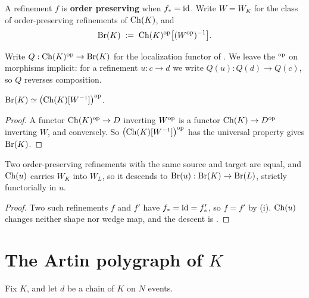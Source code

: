\documentclass[11pt]{article}
\begin{document}
\begin{definition}\label{def:W}
  A refinement $f$ is \textbf{order preserving} when $f_* = \operatorname{id}$. Write $W = W_K$ for
  the class of order-preserving refinements of $\operatorname{Ch}(K)$, and
  \[
    \operatorname{Br}(K) \;:=\; \operatorname{Ch}(K)^{\mathrm{op}}\bigl[(W^{\mathrm{op}})^{-1}\bigr] .
  \]
\end{definition}

Write $Q : \operatorname{Ch}(K)^{\mathrm{op}} \to \operatorname{Br}(K)$ for the localization functor of . We leave the
$^{\mathrm{op}}$ on morphisms implicit: for a refinement $u : c \to d$ we write $Q(u) : Q(d) \to Q(c)$, so $Q$
reverses composition.

\begin{proposition}\label{prop:brop}
  $\operatorname{Br}(K) \simeq \bigl(\operatorname{Ch}(K)[W^{-1}]\bigr)^{\mathrm{op}}$.
\end{proposition}
\begin{proof}
  A functor $\operatorname{Ch}(K)^{\mathrm{op}} \to D$ inverting $W^{\mathrm{op}}$ is a functor $\operatorname{Ch}(K) \to D^{\mathrm{op}}$ inverting $W$, and
  conversely. So $\bigl(\operatorname{Ch}(K)[W^{-1}]\bigr)^{\mathrm{op}}$ has the universal property  gives
  $\operatorname{Br}(K)$.
\end{proof}

\begin{proposition}\label{prop:W}
  Two order-preserving refinements with the same source and target are equal, and $\operatorname{Ch}(u)$
  carries $W_K$ into $W_L$, so it descends to $\operatorname{Br}(u) : \operatorname{Br}(K) \to \operatorname{Br}(L)$, strictly functorially
  in $u$.
\end{proposition}
\begin{proof}
  Two such refinements $f$ and $f'$ have $f_* = \operatorname{id} = f'_*$, so $f = f'$ by
  (i). $\operatorname{Ch}(u)$ changes neither shape nor wedge map, and the descent is
  .
\end{proof}


\section{The Artin polygraph of \texorpdfstring{$K$}{K}}\label{sec:poly}


Fix $K$, and let $d$ be a chain of $K$ on $N$ events.
\end{document}
